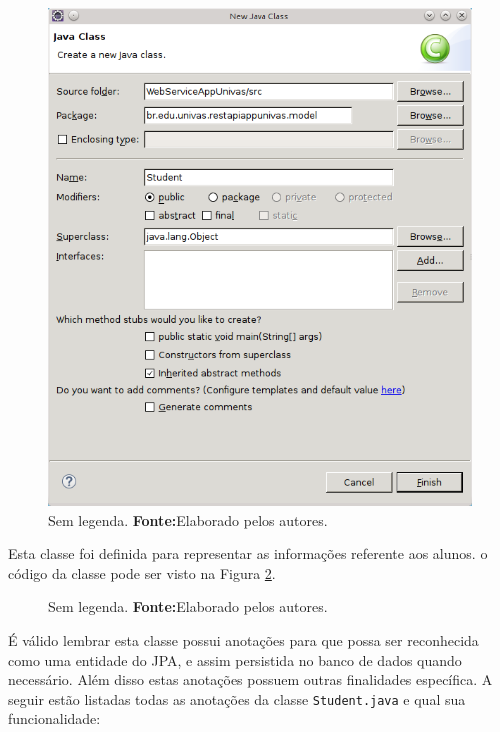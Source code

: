 	 \begin{figure}[h!]
		\centerline{\includegraphics[scale=0.8]{./imagens/2_q_metodologico/4_procedimentos_resultados/43_webservice/432_desenvolvimento/desws10.png}}
		\caption[Sem legenda]{Sem legenda.
			\textbf{Fonte:}Elaborado pelos autores.}
		\label{fig:desws10}
	\end{figure}
	
	\pagebreak

	\par Esta classe foi definida para representar as informações referente aos
alunos. o código da classe pode ser visto na Figura \ref{fig:desws11}. 
	
	
	\begin{figure}[h!]
		
		\caption[Sem legenda]{Sem legenda.
			\textbf{Fonte:}Elaborado pelos autores.}
		\label{fig:desws11}
	\end{figure}
	
	\pagebreak
	
	\par É válido lembrar esta classe possui anotações para que possa ser
reconhecida como uma entidade do JPA, e assim persistida no banco de dados
quando necessário. Além disso estas anotações possuem outras finalidades
específica. A seguir estão listadas todas as anotações da classe
\texttt{Student.java} e qual sua funcionalidade:

